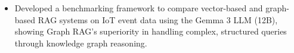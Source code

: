 \begin{cventries}
{\begin{cvitems}
\begin{itemize}
          \item {Developed a benchmarking framework to compare vector-based and graph-based RAG systems on IoT event data using the Gemma 3 LLM (12B), showing Graph RAG's superiority in handling complex, structured queries through knowledge graph reasoning.}
      \end{itemize}
    \end{cvitems}
  }

\end{cventries}
